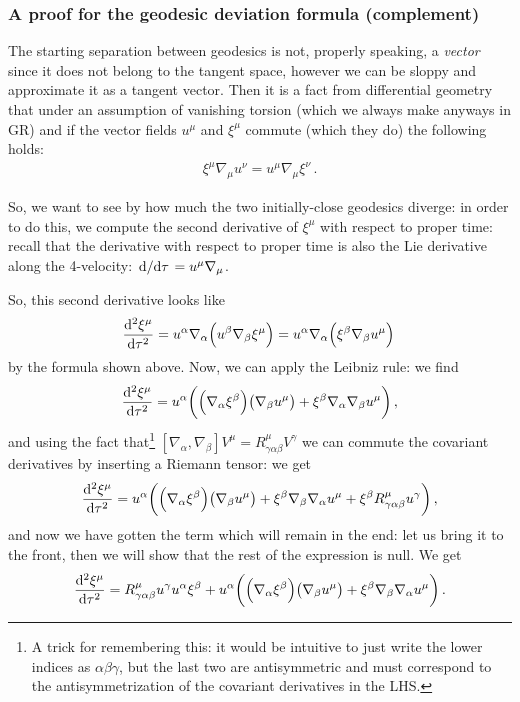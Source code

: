 \documentclass[main.tex]{subfiles}
\begin{document}
\subsubsection{A proof for the geodesic deviation formula (complement)}

The starting separation between geodesics is not, properly speaking, a \emph{vector} since it does not belong to the tangent space, however we can be sloppy and approximate it as a tangent vector.
Then it is a fact from differential geometry that under an assumption of vanishing torsion (which we always make anyways in GR) and if the vector fields \(u^{\mu }\) and \(\xi^{\mu }\) commute (which they do) the following holds: 
%
\begin{align} \label{eq:lie-bracket-commutation}
  \xi^{\mu } \nabla_{\mu } u^{\nu } = u^{\mu } \nabla_{\mu } \xi^{\nu }
\,.
\end{align}

So, we want to see by how much the two initially-close geodesics diverge: in order to do this, we compute the second derivative of \(\xi^{\mu }\) with respect to proper time: recall that the derivative with respect to proper time is also the Lie derivative along the 4-velocity: \(\dv*{}{\tau } = u^{\mu } \nabla_{\mu }\). 

So, this second derivative looks like 
%
\begin{align}
  \dv[2]{\xi^{ \mu } }{\tau } = u^{\alpha } \nabla_{\alpha } \qty(u^{\beta } \nabla_{\beta } \xi^{\mu })
  = u^{\alpha } \nabla_{\alpha } \qty( \xi^{\beta }\nabla_{\beta } u^{\mu } )
\,
\end{align}
%
by the formula shown above. Now, we can apply the Leibniz rule: we find 
%
\begin{align}
  \dv[2]{\xi^{\mu }}{\tau } = u^{\alpha } \qty( \qty(\nabla_{\alpha } \xi^{\beta }) \qty(\nabla_{\beta } u^{\mu })  
  + \xi^{\beta } \nabla_{\alpha } \nabla_{\beta } u^{\mu } )
\,,
\end{align}
%
and using the fact that\footnote{A trick for remembering this: it would be intuitive to just write the lower indices as \(\alpha \beta \gamma \), but the last two are antisymmetric and must correspond to the antisymmetrization of the covariant derivatives in the LHS.} \([\nabla_{\alpha }, \nabla_{\beta }] V^{\mu } = R^{\mu }_{ \gamma \alpha \beta  } V^{\gamma }\) we can commute the covariant derivatives by inserting a Riemann tensor: we get 
%
\begin{align}
  \dv[2]{\xi^{\mu }}{\tau } = u^{\alpha } \qty( \qty(\nabla_{\alpha } \xi^{\beta }) \qty(\nabla_{\beta } u^{\mu })  
  + \xi^{\beta } \nabla_{\beta }\nabla_{\alpha } u^{\mu }
  + \xi^{\beta } R^{\mu }_{ \gamma \alpha \beta  } u^{\gamma } )
\,,
\end{align}
%
and now we have gotten the term which will remain in the end: let us bring it to the front, then we will show that the rest of the expression is null. We get 
%
\begin{align}
  \dv[2]{\xi^{\mu }}{\tau } =
  R^{\mu }_{ \gamma \alpha \beta  } u^{\gamma } u^{\alpha } \xi^{\beta } 
  + 
  u^{\alpha } \qty( \qty(\nabla_{\alpha } \xi^{\beta }) \qty(\nabla_{\beta } u^{\mu })  
  + \xi^{\beta } \nabla_{\beta }\nabla_{\alpha } u^{\mu } )
\,.
\end{align}
%
\end{document}
